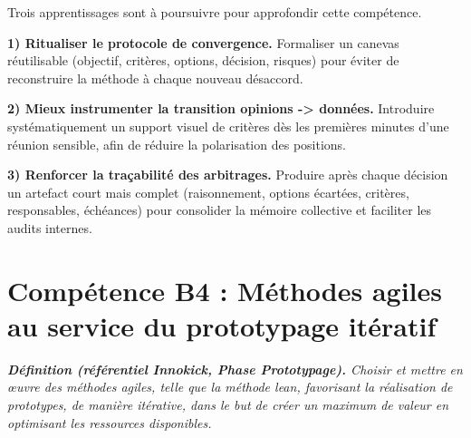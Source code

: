 Trois apprentissages sont à poursuivre pour approfondir cette compétence.

\textbf{1) Ritualiser le protocole de convergence.}
Formaliser un canevas réutilisable (objectif, critères, options, décision, risques) pour éviter de reconstruire la méthode à chaque nouveau désaccord.

\textbf{2) Mieux instrumenter la transition opinions -> données.}
Introduire systématiquement un support visuel de critères dès les premières minutes d'une réunion sensible, afin de réduire la polarisation des positions.

\textbf{3) Renforcer la traçabilité des arbitrages.}
Produire après chaque décision un artefact court mais complet (raisonnement, options écartées, critères, responsables, échéances) pour consolider la mémoire collective et faciliter les audits internes.

\section{Compétence B4 : Méthodes agiles au service du prototypage itératif}
\label{sec:competence-b4}

\begin{tcolorbox}[colback=gray!5, colframe=gray!40, boxrule=0.4pt, arc=3pt,
  left=8pt, right=8pt, top=6pt, bottom=6pt]
\small\itshape
\textbf{Définition (référentiel Innokick, Phase Prototypage).}
Choisir et mettre en œuvre des méthodes agiles, telle que la méthode lean\footnotemark, favorisant la réalisation de prototypes\footnotemark, de manière itérative\footnotemark, dans le but de créer un maximum de valeur en optimisant les ressources disponibles.
\end{tcolorbox}
\addtocounter{footnote}{-3}%
\addtocounter{footnote}{1}%
\addtocounter{footnote}{1}%
\addtocounter{footnote}{1}

